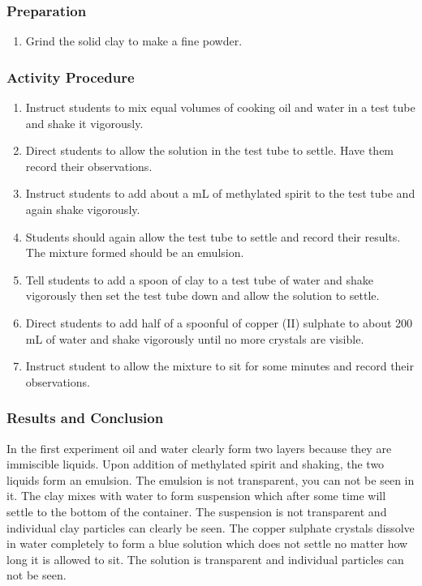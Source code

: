 \subsubsection*{Preparation}
\begin{enumerate}
\item{Grind the solid clay to make a fine powder.}
\end{enumerate}

\subsubsection*{Activity Procedure}
\begin{enumerate}
\item{Instruct students to mix equal volumes of cooking oil and water in a test tube and shake it vigorously.}
\item{Direct students to allow the solution in the test tube to settle. Have them record their observations.}
\item{Instruct students to add about a mL of methylated spirit to the test tube and again shake vigorously.}
\item{Students should again allow the test tube to settle and record their results. The mixture formed should be an emulsion.}
\item{Tell students to add a spoon of clay to a test tube of water and shake vigorously then set the test tube down and allow the solution to settle.}
\item{Direct students to add half of a spoonful of copper (II) sulphate to about 200 mL of water and shake vigorously until no more crystals are visible.}
\item{Instruct student to allow the mixture to sit for some minutes and record their observations.}
\end{enumerate}

\subsubsection*{Results and Conclusion}
In the first experiment oil and water clearly form two layers because they are immiscible liquids. Upon addition of methylated spirit and shaking, the two liquids form an emulsion. The emulsion is not transparent, you can not be seen in it.
The clay mixes with water to form suspension which after some time will settle to the bottom of the container. The suspension is not transparent and individual clay particles can clearly be seen.
The copper sulphate crystals dissolve in water completely to form a blue solution which does not settle no matter how long it is allowed to sit. The solution is transparent and individual particles can not be seen.

